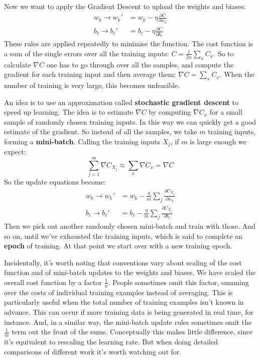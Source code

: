 \documentclass[12pt, letterpaper]{article}
\theoremstyle{definition}
\let\tb\textbf
\begin{document}
Now we want to apply the Gradient Descent to upload the weights and biases:
\begin{equation}
\begin{aligned}
w_k \rightarrow w_k' &= w_k - \eta \frac{\partial C}{\partial w_k}\\
b_\ell \rightarrow b_\ell' &= b_\ell - \eta \frac{\partial C}{\partial b_\ell}
\end{aligned}
\end{equation}
These rules are applied repeatedly to minimise the function. The cost function is a sum of the single errors over all the training inputs: $C = \frac{1}{2n}\sum_x C_x$. So to calculate $\nabla C$ one has to go through over all the samples, and compute the gradient for each training input and then average them: $\nabla C = \sum_x C_x$. When the number of training is very large, this becomes unfeasible. 

An idea is to use an approximation called \tb{stochastic gradient descent} to speed up learning. The idea is to estimate $\nabla C$ by computing $\nabla C_x$ for a small sample of randomly chosen training inputs. In this way we can quickly get a good estimate of the gradient. So instead of all the samples, we take $m$ training inputs, forming a \tb{mini-batch}. Calling the training inputs $X_j$, if $m$ is large enough we expect:
\begin{equation}
\sum_{j=1}^{m} \nabla C_{X_j}\approx \sum_{x}\nabla C_x =\nabla C
\end{equation}
So the update equations become:
\begin{equation}
\begin{aligned}
w_k \rightarrow w_k' &= w_k - \frac{\eta}{m} \sum_j  \frac{\partial C_{X_j}}{\partial w_k}\\
b_\ell \rightarrow b_\ell' &= b_\ell - \frac{\eta}{m} \sum_j  \frac{\partial C_{X_j}}{\partial b_\ell}
\end{aligned}
\end{equation}
Then we pick out another randomly chosen mini-batch and train with those. And so on, until we've exhausted the training inputs, which is said to complete an \tb{epoch} of training. At that point we start over with a new training epoch.

Incidentally, it's worth noting that conventions vary about scaling of the cost function and of mini-batch updates to the weights and biases. We have scaled the overall cost function by a factor $\frac{1}{n}$. People sometimes omit this factor, summing over the costs of individual training examples instead of averaging. This is particularly useful when the total number of training examples isn't known in advance. This can occur if more training data is being generated in real time, for instance. And, in a similar way, the mini-batch update rules sometimes omit the $\frac{1}{m}$ term out the front of the sums. Conceptually this makes little difference, since it's equivalent to rescaling the learning rate. But when doing detailed comparisons of different work it's worth watching out for.
\end{document}
